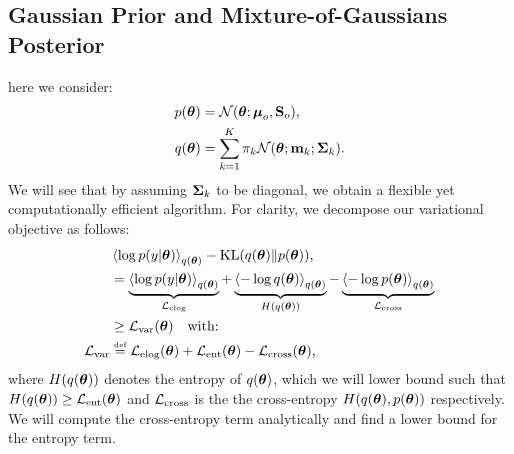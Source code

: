 \subsection{Gaussian Prior and Mixture-of-Gaussians Posterior}
here we consider:
\begin{align}
	p(\boldsymbol{ \theta }) &= \mathcal{N}(\boldsymbol{ \theta }; \boldsymbol{ \mu }_{o}, \mathbf{S}_{o}) \text{,}\\
	q(\boldsymbol{ \theta }) &=   \sum_{k=1}^{K} \pi_{k} \mathcal{N}(\boldsymbol{ \theta }; \mathbf{m}_{k}; \mathbf{\Sigma}_{k}) \text{.}
\end{align}
%
We will see that by assuming $\mathbf{\Sigma}_{k}$ to be diagonal, we obtain a flexible yet computationally efficient algorithm.
%
For clarity, we decompose our variational objective as follows:
\begin{align}
\label{eq:lvartruefwdMoG}
 & \Eb{\log p(y | \vectheta)}_{q(\vectheta)} -\kl{q(\vectheta)}{p(\vectheta)}  \text{,} \\
& = \underbrace{\Eb{\log p(y | \vectheta)}_{q(\vectheta)}}_{\lelog} +  
\underbrace{\Eb{ - \log q(\vectheta)}_{q(\vectheta)}}_{H(q(\vectheta))}  - \underbrace{\Eb{ - \log p(\vectheta)}_{q(\vectheta)}}_{\lcross}  \\
& \geq \lvar(\vectheta)  \quad \text{with:} \\
\lvar & \defeq \lelog(\vectheta) + \lent(\vectheta) - \lcross(\vectheta)  \text{,}
\end{align}
%
where $H(q(\boldsymbol{ \theta }))$ denotes the entropy of $q(\boldsymbol{ \theta })$, which we will lower bound such that $H(q(\boldsymbol{ \theta })) \geq \mathcal{L}_{\text{ent}}(\boldsymbol{ \theta })$ and $\mathcal{L}_{\text{cross}}$ is the the cross-entropy $H(q(\boldsymbol{ \theta }), p(\boldsymbol{ \theta }))$ respectively. We will 
compute the cross-entropy term analytically and find a lower bound for the entropy term.
